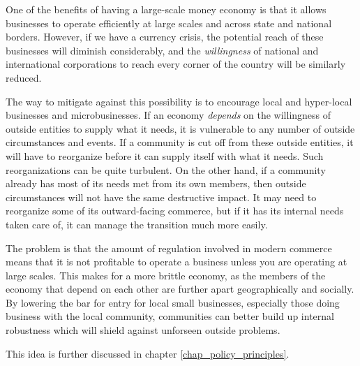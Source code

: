 \begin{policynote}
One of the benefits of having a large-scale money economy is that it
allows businesses to operate efficiently at large scales and across
state and national borders.  However, if we have a currency crisis, 
the potential reach of these businesses will diminish considerably,
and the \textit{willingness} of national and international corporations to 
reach every corner of the country will be similarly reduced.

The way to mitigate against this possibility is to encourage local and
hyper-local businesses and microbusinesses.  If an economy \textit{depends}
on the willingness of outside entities to supply what it needs, it is 
vulnerable to any number of outside circumstances and events.  If a 
community is cut off from these outside entities, it will have to reorganize
before it can supply itself with what it needs.  Such reorganizations can
be quite turbulent.  On the other hand, if a community already has
most of its needs met from its own members, then outside circumstances
will not have the same destructive impact.  It may need to reorganize
some of its outward-facing commerce, but if it has its internal needs
taken care of, it can manage the transition much more easily.

The problem is that the amount of regulation involved in modern commerce
means that it is not profitable to operate a business unless you are 
operating at large scales.  This makes for a more brittle economy, as
the members of the economy that depend on each other are further apart
geographically and socially.  By lowering the bar for entry for 
local small businesses, especially those doing business with the 
local community, communities can better build up 
internal robustness which will shield against unforseen outside problems.

This idea is further discussed in chapter \ref{chap_policy_principles}.
\end{policynote}

